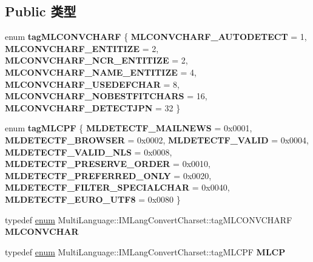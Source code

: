 \subsection*{Public 类型}
\begin{DoxyCompactItemize}
\item 
\mbox{\label{interface_multi_language_1_1_i_m_lang_convert_charset_a050a4fb31ff210d4e5f60a18de714eb4}} 
enum {\bfseries tag\+M\+L\+C\+O\+N\+V\+C\+H\+A\+RF} \{ \newline
{\bfseries M\+L\+C\+O\+N\+V\+C\+H\+A\+R\+F\+\_\+\+A\+U\+T\+O\+D\+E\+T\+E\+CT} = 1, 
{\bfseries M\+L\+C\+O\+N\+V\+C\+H\+A\+R\+F\+\_\+\+E\+N\+T\+I\+T\+I\+ZE} = 2, 
{\bfseries M\+L\+C\+O\+N\+V\+C\+H\+A\+R\+F\+\_\+\+N\+C\+R\+\_\+\+E\+N\+T\+I\+T\+I\+ZE} = 2, 
{\bfseries M\+L\+C\+O\+N\+V\+C\+H\+A\+R\+F\+\_\+\+N\+A\+M\+E\+\_\+\+E\+N\+T\+I\+T\+I\+ZE} = 4, 
\newline
{\bfseries M\+L\+C\+O\+N\+V\+C\+H\+A\+R\+F\+\_\+\+U\+S\+E\+D\+E\+F\+C\+H\+AR} = 8, 
{\bfseries M\+L\+C\+O\+N\+V\+C\+H\+A\+R\+F\+\_\+\+N\+O\+B\+E\+S\+T\+F\+I\+T\+C\+H\+A\+RS} = 16, 
{\bfseries M\+L\+C\+O\+N\+V\+C\+H\+A\+R\+F\+\_\+\+D\+E\+T\+E\+C\+T\+J\+PN} = 32
 \}
\item 
\mbox{\label{interface_multi_language_1_1_i_m_lang_convert_charset_aa0b7f6bd4d85e9484c318f9ccbe2047a}} 
enum {\bfseries tag\+M\+L\+C\+PF} \{ \newline
{\bfseries M\+L\+D\+E\+T\+E\+C\+T\+F\+\_\+\+M\+A\+I\+L\+N\+E\+WS} = 0x0001, 
{\bfseries M\+L\+D\+E\+T\+E\+C\+T\+F\+\_\+\+B\+R\+O\+W\+S\+ER} = 0x0002, 
{\bfseries M\+L\+D\+E\+T\+E\+C\+T\+F\+\_\+\+V\+A\+L\+ID} = 0x0004, 
{\bfseries M\+L\+D\+E\+T\+E\+C\+T\+F\+\_\+\+V\+A\+L\+I\+D\+\_\+\+N\+LS} = 0x0008, 
\newline
{\bfseries M\+L\+D\+E\+T\+E\+C\+T\+F\+\_\+\+P\+R\+E\+S\+E\+R\+V\+E\+\_\+\+O\+R\+D\+ER} = 0x0010, 
{\bfseries M\+L\+D\+E\+T\+E\+C\+T\+F\+\_\+\+P\+R\+E\+F\+E\+R\+R\+E\+D\+\_\+\+O\+N\+LY} = 0x0020, 
{\bfseries M\+L\+D\+E\+T\+E\+C\+T\+F\+\_\+\+F\+I\+L\+T\+E\+R\+\_\+\+S\+P\+E\+C\+I\+A\+L\+C\+H\+AR} = 0x0040, 
{\bfseries M\+L\+D\+E\+T\+E\+C\+T\+F\+\_\+\+E\+U\+R\+O\+\_\+\+U\+T\+F8} = 0x0080
 \}
\item 
\mbox{\label{interface_multi_language_1_1_i_m_lang_convert_charset_a5b38d5fe7ac2c1da5a9e656e00eed293}} 
typedef \hyperlink{interfaceenum}{enum} Multi\+Language\+::\+I\+M\+Lang\+Convert\+Charset\+::tag\+M\+L\+C\+O\+N\+V\+C\+H\+A\+RF {\bfseries M\+L\+C\+O\+N\+V\+C\+H\+AR}
\item 
\mbox{\label{interface_multi_language_1_1_i_m_lang_convert_charset_ac5a41b6dfc36576758c9a4e9cd32630e}} 
typedef \hyperlink{interfaceenum}{enum} Multi\+Language\+::\+I\+M\+Lang\+Convert\+Charset\+::tag\+M\+L\+C\+PF {\bfseries M\+L\+CP}
\end{DoxyCompactItemize}
